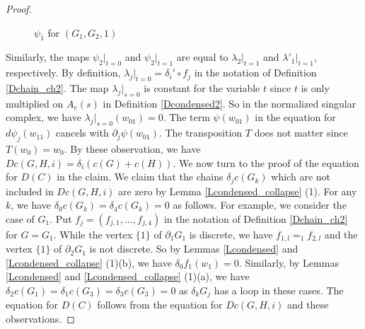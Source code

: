 \documentclass[reqno]{amsart}
\theoremstyle{definition}
\theoremstyle{plain}
\begin{document}
\begin{proof}
\begin{figure}[H]
\begin{center}
\end{center}
\vspace{4mm}
\caption{$\psi_1$ for $(G_1,G_2,1)$}\label{Fpsi1edge}
\vspace{-7mm}
\end{figure}
Similarly, the maps $\psi_2|_{t=0}$ and $\psi_2|_{t=1}$ are equal to $\lambda_2|_{t=1}$ and $\lambda'_1|_{t=1}$, respectively.
By definition, $\lambda_j|_{t=0}=\delta_i'\circ f_j$ in the notation of Definition \ref{Dchain_ch2}.  The map $\lambda_j|_{s=0}$ is constant for the variable $t$ since $t$ is only multiplied on $A_e(s)$ in Definition \ref{Dcondensed2}.  So in the normalized singular complex, we have $\lambda_j|_{s=0}(w_{01})=0$. The term $\psi(w_{01})$ in the equation for $d\psi_j(w_{11})$ cancels with $\partial_j \psi(w_{01})$. The transposition $T$ does not matter since $T(w_0)=w_0$. By these observation, we have $Dc(G,H,i)=\delta_i(c(G)+c(H))$. 
We now turn to the proof of  the equation for $D(C)$ in the claim.  We claim that the chains $\delta_jc(G_k)$ which are not included in $Dc(G,H,i)$ are zero by Lemma \ref{Lcondensed_collapse} (1). For any $k$,  we have $\delta_0c(G_k)=\delta_4c(G_k)=0$ as follows. For example, we consider the case of $G_1$. Put $f_j=(f_{j,1},\dots, f_{j,4})$ in the notation of Definition \ref{Dchain_ch2} for $G=G_1$. While the vertex $\{1\}$ of $\partial_1G_1$ is discrete, we have $f_{1,l}=_1f_{2,l}$ and the vertex $\{1\}$ of  $\partial_2G_1$ is not discrete. So by Lemmas \ref{Lcondensed} and \ref{Lcondensed_collapse} (1)(b), we have $\delta_0f_1(w_1)=0$.  Similarly,   by Lemmas \ref{Lcondensed} and \ref{Lcondensed_collapse} (1)(a), we have $\delta_2c(G_1)=\delta_1c(G_3)=\delta_3c(G_3)=0$ as $\delta_kG_j$ has a loop in these cases.  The equation for $D(C)$ follows from the  equation for $Dc(G, H,i)$ and these observations.  
\end{proof}
\end{document}
